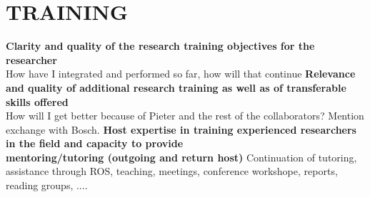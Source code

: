 \section{TRAINING} %
\label{sec:training}
\textbf{Clarity and quality of the research training objectives for the researcher} \\
How have I integrated and performed so far, how will that continue
\textbf{Relevance and quality of additional research training as well as of transferable skills offered} \\
How will I get better because of Pieter and the rest of the collaborators?
Mention exchange with Bosch.
\textbf{Host expertise in training  experienced researchers in the field and capacity to provide  \\
mentoring/tutoring (outgoing and return host)} 
Continuation of tutoring, assistance through ROS, teaching, meetings, conference workshope, reports, reading groups, 
....
\newpage


